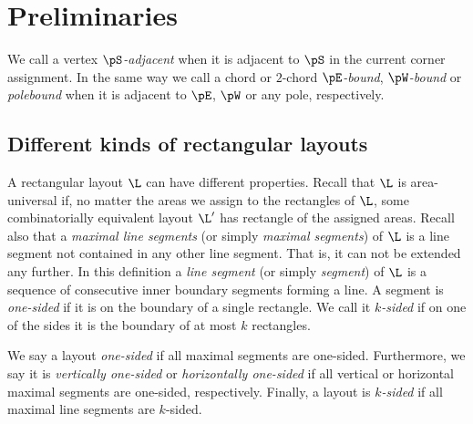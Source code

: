 
\section{Preliminaries}
\thispagestyle{plain}

  We call a vertex \emph{$\pS$-adjacent} when it is adjacent to $\pS$ in the current corner assignment. In the same way we call a chord or $2$-chord \emph{$\pE$-bound}, \emph{$\pW$-bound} or \emph{polebound} when it is adjacent to $\pE$, $\pW$ or any pole,  respectively.


 \subsection{Different kinds of rectangular layouts}
   A rectangular layout $\L$ can have different properties.
   Recall that $\L$ is area-universal if, no matter the areas we assign to the rectangles of $\L$, some combinatorially equivalent layout $\L'$ has rectangle of the assigned areas.
   Recall also that a \emph{maximal line segments} (or simply \emph{maximal segments}) of $\L$ is a line segment not contained in any other line segment. That is, it can not be extended any further. In this definition a \emph{line segment} (or simply \emph{segment}) of $\L$ is a sequence of consecutive inner boundary segments forming a line.
   A segment is \emph{one-sided} if it is on the boundary of a single rectangle. We call it \emph{$k$-sided} if on one of the sides it is the boundary of at most $k$ rectangles.


   We say a layout \emph{one-sided} if all maximal segments are one-sided.
   Furthermore,  we say it is \emph{vertically one-sided} or \emph{horizontally one-sided} if all vertical or horizontal maximal segments are one-sided, respectively. Finally, a layout is \emph{$k$-sided} if all maximal line segments are $k$-sided.
